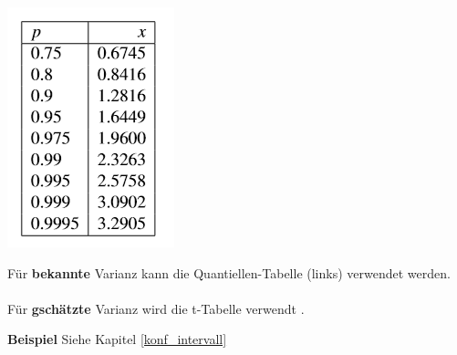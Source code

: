 \begin{center}
	\begin{minipage}{0.20\textwidth}
		\begin{center}
			\includegraphics[width=\linewidth,keepaspectratio=true]{Images/quantile-normalverteilung}\\
		\end{center}
	\end{minipage}%
	\begin{minipage}{0.3\textwidth}
		\noindent Für \textbf{bekannte} Varianz kann die Quantiellen-Tabelle (links) verwendet werden.\\ ~\\
		\noindent Für \textbf{gschätzte} Varianz wird die t-Tabelle verwendt .\\
	\end{minipage}
\end{center}





\noindent\textbf{Beispiel} Siehe Kapitel \ref{konf_intervall}\\

